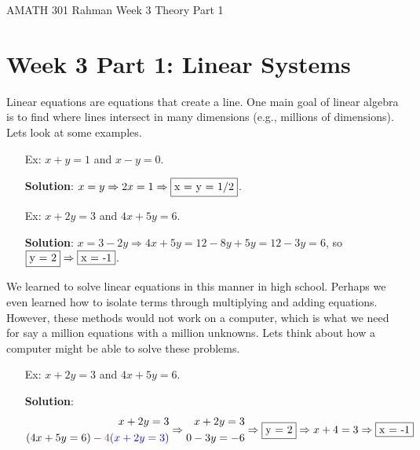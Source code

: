 \documentclass[reqno]{amsart}
\theoremstyle{definition}
\begin{document}
\begin{flushleft}
{\sc \Large AMATH 301 Rahman} \hfill Week 3 Theory Part 1
\bigskip
\end{flushleft}

\newcommand{\R}{\mathbb{R}}
\newcommand{\N}{\mathbb{N}}
\newcommand{\Z}{\mathbb{Z}}
\newcommand{\Q}{\mathbb{Q}}
\renewcommand{\CancelColor}{\color{red}}
\newcommand{\?}{\stackrel{?}{=}}
\renewcommand{\varphi}{\phi}
\newcommand{\card}{\text{Card}}
\newcommand{\bigzero}{\text{\Huge 0}}



\section*{Week 3 Part 1:  Linear Systems}

Linear equations are equations that create a line.  One main goal of linear algebra is to find where
lines intersect in many dimensions (e.g., millions of dimensions).  Lets look at some examples.

\begin{itemize}

\item[Ex:  ]  $x + y = 1$ and $x - y = 0$.

 \textbf{Solution}: $x = y \Rightarrow 2x = 1 \Rightarrow \fbox{x = y = 1/2}$.

\item[Ex:  ]  $x + 2y = 3$ and $4x + 5y = 6$. 

\textbf{Solution}: $x = 3 - 2y \Rightarrow 4x + 5y = 12 - 8y + 5y = 12 - 3y = 6$,
so $\fbox{y = 2} \Rightarrow \fbox{x = -1}$.

\end{itemize}

We learned to solve linear equations in this manner in high school.  Perhaps we even learned how to
isolate terms through multiplying and adding equations.  However, these methods would not work on
a computer, which is what we need for say a million equations with a million unknowns.  Lets think about
how a computer might be able to solve these problems.

\begin{itemize}

\item[Ex:  ]  $x + 2y = 3$ and $4x + 5y = 6$. 

\textbf{Solution}:
\begin{equation*}
\begin{split}
x + 2y = 3\\
(4x + 5y = 6) - {\color{red}4}{\color{blue}(x + 2y = 3)}
\end{split} \Rightarrow 
\begin{split}
x + 2y = 3\\
0 - 3y = -6
\end{split} \Rightarrow
\fbox{y = 2} \Rightarrow x+4 = 3 \Rightarrow \fbox{x = -1}
\end{equation*}

\end{itemize}
\end{document}
